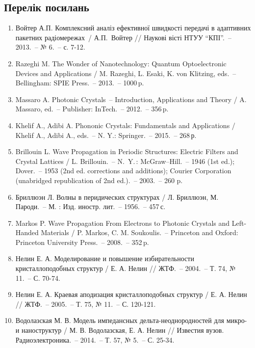 \begin{multicols}{2}
\section*{Перелік посилань}
\begin{enumerate}\footnotesize
	\item Войтер А.П.  Комплексний аналіз ефективної швидкості передачі в адаптивних пакетних радіомережах~/ А.П.~Войтер  // Наукові вісті НТУУ ``КПІ''.~-- 2013.~-- № 6.~-- с. 7-12.
	\item Razeghi M. The Wonder of Nanotechnology: Quantum Optoelectronic Devices and Applications / M. Razeghi, L. Esaki, K. von Klitzing, eds.~--  Bellingham: SPIE Press.~--  2013.~--  1000\,p.
	\item Massaro A. Photonic Crystals~--  Introduction, Applications and Theory / A. Massaro, ed.~--  Publisher: InTech.~--  2012.~--  356\,p.
	\item Khelif A., Adibi A. Phononic Crystals: Fundamentals and Applications / Khelif A., Adibi A., eds.~--  N. Y.: Springer.~--  2015.~--  268\,р.
	\item Brillouin L. Wave Propagation in Periodic Structures: Electric Filters and Crystal Lattices / L. Brillouin.~--  N.~Y.\,: McGraw–Hill.~--  1946 (1st ed.); Dover.~--  1953 (2nd ed. corrections and additions); Courier Corporation (unabridged republication of 2nd ed.).~--  2003.~--  260 p.
	\item Бриллюэн Л. Волны в перидических структурах / Л. Бриллюэн, М. Пароди.~--  М. : Изд. иностр. лит.~--  1956.~--  457\,с.
	\item Markos P. Wave Propagation From Electrons to Photonic Crystals and Left-Handed Materials / P. Markos, C. M. Soukoulis.~--  Princeton and Oxford: Princeton University Press.~--  2008.~--  352\,p.
	\item Нелин Е. А. Моделирование и повышение избирательности кристаллоподобных структур / Е. А. Нелин // ЖТФ.~--  2004.~--  Т. 74, № 11.~--  С. 70-74.
	\item Нелин Е. А. Краевая аподизация кристаллоподобных структур / Е. А. Нелин // ЖТФ.~-- 2005.~-- Т. 75, № 11.~-- С. 120-121.
	\item Водолазская М. В. Модель импедансных дельта-неоднородностей для микро- и наноструктур / М. В. Водолазская, Е. А. Нелин // Известия вузов. Радиоэлектроника.~-- 2014.~-- Т. 57, № 5.~-- С. 25-34.
\end{enumerate}

\renewcommand{\refname}{References}


\end{multicols}
